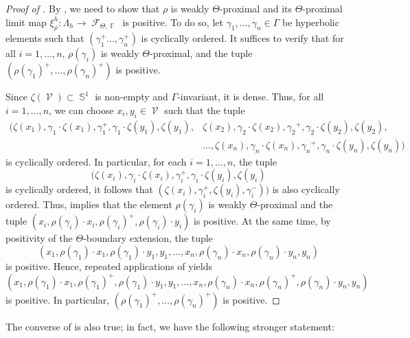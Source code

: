 \documentclass{amsart}
\theoremstyle{plain}
\theoremstyle{definition}
\DeclareMathOperator{\Fc}{\mathcal{F}}
\DeclareMathOperator{\Vc}{\mathcal{V}}
\DeclareMathOperator{\Fb}{{\mathbb{F}}}
\DeclareMathOperator{\Sb}{\mathbb{S}}
\newcommand{\1}{\mathbf{1}}
\begin{document}
\begin{proof}[Proof of ]
By , we need to show that $\rho$ is weakly $\Theta$-proximal and its $\Theta$-proximal limit map $\xi^h_\rho:\Lambda_h\to\Fc_{\Theta,\Fb}$ is positive. To do so, let $\gamma_1,\ldots, \gamma_n \in \Gamma$ be hyperbolic elements such that $(\gamma_1^+\ldots, \gamma_n^+)$ is cyclically ordered. It suffices to verify that for all $i=1,\dots,n$, $\rho(\gamma_i)$ is weakly $\Theta$-proximal, and the tuple $(\rho(\gamma_1)^+, \ldots, \rho(\gamma_n)^+)$ is positive.

Since $\zeta(\Vc)\subset\Sb^1$ is non-empty and $\Gamma$-invariant, it is dense. Thus, for all $i=1,\dots,n$, we can choose $x_i, y_i\in  \Vc$ such that the tuple
\begin{align*}
(\zeta(x_1), \gamma_1\cdot \zeta(x_1), \gamma_1^+, \gamma_1\cdot \zeta(y_1), \zeta(y_1),&\zeta(x_2), \gamma_2\cdot \zeta(x_2), {\gamma_2}^+, \gamma_2\cdot \zeta(y_2), \zeta(y_2), \\
&\ldots, \zeta(x_n), \gamma_n\cdot \zeta(x_n), {\gamma_n}^+, \gamma_n\cdot \zeta(y_n), \zeta(y_n))
\end{align*}
is cyclically ordered. In particular, for each $i=1,\dots,n$, the tuple 
\[(\zeta(x_i), \gamma_i\cdot \zeta(x_i), \gamma_i^+, \gamma_i\cdot \zeta(y_i), \zeta(y_i)\] 
is cyclically ordered, it follows that $(\zeta(x_i), \gamma_i^+, \zeta(y_i),\gamma_i^-)\big)$ is also cyclically ordered. Thus,  implies that the element $\rho(\gamma_i)$ is weakly $\Theta$-proximal and the tuple $(x_i, \rho(\gamma_i)\cdot x_i, \rho(\gamma_i)^+, \rho(\gamma_i)\cdot y_i)$ is positive. At the same time, by positivity of the $\Theta$-boundary extension, the tuple 
\[(x_1, \rho(\gamma_1)\cdot x_1, \rho(\gamma_1)\cdot y_1, y_1, \ldots, x_n, \rho(\gamma_n)\cdot x_n, \rho(\gamma_n) \cdot y_n, y_n)\] is positive.
Hence, repeated applications of  yields 
\[(x_1, \rho(\gamma_1)\cdot x_1, \rho(\gamma_1)^+, \rho(\gamma_1)\cdot y_1, y_1, \ldots, x_n, \rho(\gamma_n)\cdot x_n, \rho(\gamma_n)^+, \rho(\gamma_n) \cdot y_n, y_n)\] is positive. In particular, $(\rho(\gamma_1)^+, \ldots, \rho(\gamma_n)^+)$ is positive.
\end{proof}

The converse of  is also true; in fact, we have the following stronger statement:
\end{document}
